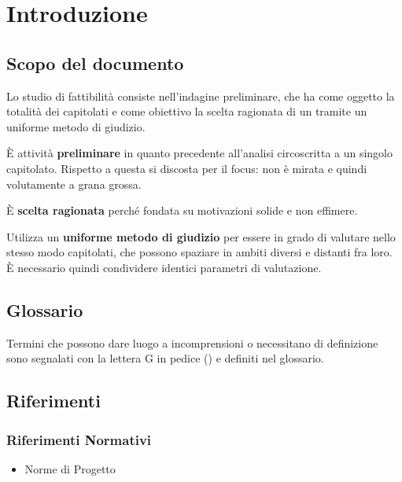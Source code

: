 \section{Introduzione}

\subsection{Scopo del documento}
Lo studio di fattibilità consiste nell'indagine preliminare, che ha come oggetto la totalità dei capitolati e come obiettivo la scelta ragionata di un  tramite un uniforme metodo di giudizio. 

È attività \textbf{preliminare} in quanto precedente all'analisi circoscritta a un singolo capitolato. Rispetto a questa si discosta per il focus: non è mirata e quindi volutamente a grana grossa. 

È \textbf{scelta ragionata} perché fondata su motivazioni solide e non effimere.

Utilizza un \textbf{uniforme metodo di giudizio} per essere in grado di valutare nello stesso modo capitolati, che possono spaziare in ambiti diversi e distanti fra loro. È necessario quindi condividere identici parametri di valutazione.

\subsection{Glossario}
Termini che possono dare luogo a incomprensioni o necessitano di definizione sono segnalati con la lettera G in pedice (\glock{ }) e definiti nel glossario. 

\subsection{Riferimenti}
\subsubsection{Riferimenti Normativi}
\begin{itemize}
	\item Norme di Progetto %
\end{itemize}

